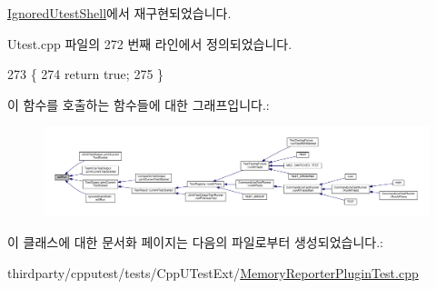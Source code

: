 \hyperlink{class_ignored_utest_shell_ab04bdecc29d175ad70926e25f94a5260}{Ignored\+Utest\+Shell}에서 재구현되었습니다.



Utest.\+cpp 파일의 272 번째 라인에서 정의되었습니다.


\begin{DoxyCode}
273 \{
274     \textcolor{keywordflow}{return} \textcolor{keyword}{true};
275 \}
\end{DoxyCode}


이 함수를 호출하는 함수들에 대한 그래프입니다.\+:
\nopagebreak
\begin{figure}[H]
\begin{center}
\leavevmode
\includegraphics[width=350pt]{class_utest_shell_afa35d9bf0fd1c772b04f48d89d318a70_icgraph}
\end{center}
\end{figure}




이 클래스에 대한 문서화 페이지는 다음의 파일로부터 생성되었습니다.\+:\begin{DoxyCompactItemize}
\item 
thirdparty/cpputest/tests/\+Cpp\+U\+Test\+Ext/\hyperlink{_memory_reporter_plugin_test_8cpp}{Memory\+Reporter\+Plugin\+Test.\+cpp}\end{DoxyCompactItemize}
